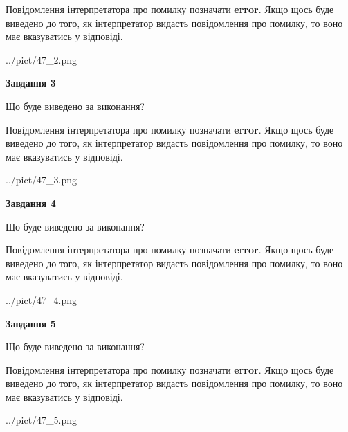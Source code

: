 \documentclass[12pt, ukrainian]{article}
\begin{document}
{\begin {large}
Повідомлення інтерпретатора про помилку позначати \textbf{error}.
Якщо щось буде виведено до того, як інтерпретатор видасть повідомлення про помилку, 
то воно має вказуватись у відповіді. \par


\begin{center}
	{../pict/47_2.png}
\end{center}
\newpage

{\begin {center}\textbf{Завдання 3}\end {center}}\par
Що буде виведено за виконання?

Повідомлення інтерпретатора про помилку позначати \textbf{error}.
Якщо щось буде виведено до того, як інтерпретатор видасть повідомлення про помилку, 
то воно має вказуватись у відповіді. \par


\begin{center}
	{../pict/47_3.png}
\end{center}
\newpage

{\begin {center}\textbf{Завдання 4}\end {center}}\par
Що буде виведено за виконання?

Повідомлення інтерпретатора про помилку позначати \textbf{error}.
Якщо щось буде виведено до того, як інтерпретатор видасть повідомлення про помилку, 
то воно має вказуватись у відповіді. \par


\begin{center}
	{../pict/47_4.png}
\end{center}
\newpage

{\begin {center}\textbf{Завдання 5}\end {center}}\par
Що буде виведено за виконання?

Повідомлення інтерпретатора про помилку позначати \textbf{error}.
Якщо щось буде виведено до того, як інтерпретатор видасть повідомлення про помилку, 
то воно має вказуватись у відповіді. \par


\begin{center}
	{../pict/47_5.png}
\end{center}
\newpage


\end{large}}
\end{document}
